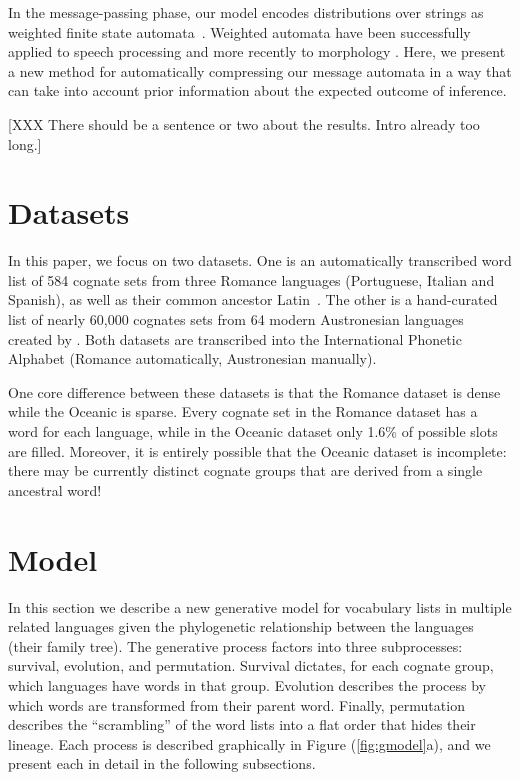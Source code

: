 \documentclass[11pt,a4paper]{article}
\begin{document}
In the message-passing phase, our model encodes distributions over strings as weighted finite
state automata~\cite{mohri09weighted}.  Weighted automata have been
successfully applied to speech processing \cite{Mohri96weightedautomata} and
more recently to morphology \cite{dreyer2009graphical}.  Here, we present
a new method for automatically compressing our message automata in a way that can take into account
prior information about the expected outcome of inference.

[XXX There should be a sentence or two about the results. Intro already too long.]

\section{Datasets}

In this paper, we focus on two datasets. One is an automatically
transcribed word list of 584 cognate sets from three Romance languages
(Portuguese, Italian and Spanish), as well as their common ancestor
Latin~\cite{bouchard07probabilistic}.  The other is a hand-curated
list of nearly 60,000 cognates sets from 64 modern Austronesian
languages created by . Both datasets are
transcribed into the International Phonetic Alphabet (Romance
automatically, Austronesian manually). 

One core difference between these datasets is that the Romance
dataset is dense while the Oceanic is sparse. Every cognate set in
the Romance dataset has a word for each language, while in the
Oceanic dataset only 1.6\% of possible slots are filled. Moreover,
it is entirely possible that the Oceanic dataset is incomplete:
there may be currently distinct cognate groups that are derived
from a single ancestral word!

\section{Model}

In this section we describe a new generative model for vocabulary lists
in multiple related languages given the phylogenetic relationship
between the languages (their family tree). The generative
process factors into three subprocesses: survival, evolution, and
permutation. Survival dictates, for each cognate group, which
languages have words in that group. Evolution describes the process
by which words are transformed from their parent word. Finally,
permutation describes the ``scrambling'' of the word lists into a flat
order that hides their lineage. Each process is
described graphically in Figure (\ref{fig:gmodel}a), and we present
each in detail in the following subsections.
\end{document}

